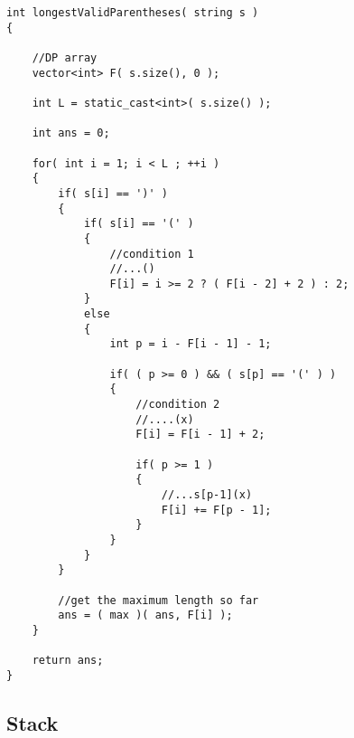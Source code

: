 \setcounter{lstlisting}{0}
\begin{lstlisting}[style=customc, caption={Dynamic Programming}]
int longestValidParentheses( string s )
{

    //DP array
    vector<int> F( s.size(), 0 );

    int L = static_cast<int>( s.size() );

    int ans = 0;

    for( int i = 1; i < L ; ++i )
    {
        if( s[i] == ')' )
        {
            if( s[i] == '(' )
            {
                //condition 1
                //...()
                F[i] = i >= 2 ? ( F[i - 2] + 2 ) : 2;
            }
            else
            {
                int p = i - F[i - 1] - 1;

                if( ( p >= 0 ) && ( s[p] == '(' ) )
                {
                    //condition 2
                    //....(x)
                    F[i] = F[i - 1] + 2;

                    if( p >= 1 )
                    {
                        //...s[p-1](x)
                        F[i] += F[p - 1];
                    }
                }
            }
        }

        //get the maximum length so far
        ans = ( max )( ans, F[i] );
    }

    return ans;
}
\end{lstlisting}
%
\subsection{Stack}

